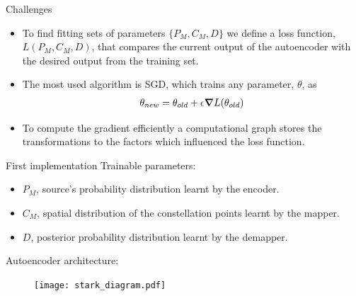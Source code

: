 \documentclass[english,aspectratio=1610,9pt,helvet,nicetitles]{ICEbeamerTUMCD}
\begin{document}
\begin{frame}{Challenges}
	\begin{figure}
    \centering
	\end{figure}
	\vspace{-5mm}
	\begin{itemize}
	\item To find fitting sets of parameters $\{P_M, C_M, D\}$ we define a loss function,  $L(P_M, C_M, D)$, that compares the current output of the autoencoder with the desired output from the training set.
	\item The most used algorithm is SGD, which trains any parameter, $\theta$, as
	\begin{align*}
	{\theta}_{new} = {\theta}_{old} + \epsilon \grad L({\theta}_{old}) %
	\end{align*}
	\item To compute the gradient efficiently a computational graph stores the transformations to the factors which influenced the loss function. %
	\end{itemize}
\end{frame}



\begin{frame}{First implementation \cite{Stark}}
	Trainable parameters:
	\vspace{-5mm}
	\begin{itemize}
		\item $P_M$, source's probability distribution learnt by the encoder.
		\item $C_M$, spatial distribution of the constellation points learnt by the mapper.
		\item $D$, posterior probability distribution learnt by the demapper.
	\end{itemize}
	\vspace{-5mm}
	Autoencoder architecture:
	\begin{figure}
		\centering
		\texttt{[image: stark\_diagram.pdf]}
		\label{fig:starkAe}
	\end{figure}
\end{frame}
\end{document}
